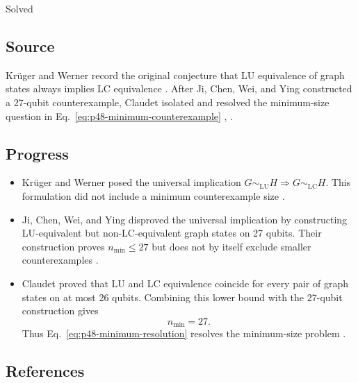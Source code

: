 Solved

\subsection*{Source}

Kr\"uger and Werner record the original conjecture that LU equivalence of
graph states always implies LC equivalence
.  After Ji, Chen, Wei, and Ying
constructed a 27-qubit counterexample, Claudet isolated and resolved the
minimum-size question in Eq.~\eqref{eq:p48-minimum-counterexample}
,
.

\subsection*{Progress}

\begin{itemize}
  \item Kr\"uger and Werner posed the universal implication
  $G\sim_{\mathrm{LU}}H\Rightarrow G\sim_{\mathrm{LC}}H$.  This formulation
  did not include a minimum counterexample size
  .

  \item Ji, Chen, Wei, and Ying disproved the universal implication by
  constructing LU-equivalent but non-LC-equivalent graph states on 27 qubits.
  Their construction proves $n_{\min}\leq27$ but does not by itself exclude
  smaller counterexamples .

  \item Claudet proved that LU and LC equivalence coincide for every pair of
  graph states on at most 26 qubits.  Combining this lower bound with the
  27-qubit construction gives
  \begin{equation}
    n_{\min}=27.
    \label{eq:p48-minimum-resolution}
  \end{equation}
  Thus Eq.~\eqref{eq:p48-minimum-resolution} resolves the minimum-size problem
  .
\end{itemize}

\subsection*{References}

